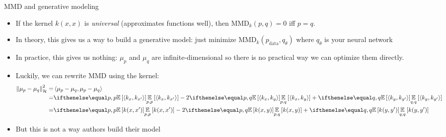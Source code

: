 \documentclass[handout, 10pt]{beamer}
\begin{document}
\begin{frame}{MMD and generative modeling}
\begin{itemize}
    \item\pause If the kernel $k(x,x)$ is \textit{universal} (approximates functions well), then $\text{MMD}_k(p,q) = 0$ iff $p = q$.
    \item\pause In theory, this gives us a way to build a generative model: just minimize $\text{MMD}_k(p_\text{data}, q_\theta)$ where $q_\theta$ is your neural network
    \item\pause In practice, this gives us nothing: $\mu_p$ and $\mu_q$ are infinite-dimensional so there is no practical way we can optimize them directly.
    \item\pause Luckily, we can rewrite $\text{MMD}$ using the kernel:
\begin{equation*}
\begin{aligned}
\left\|\mu_{p}-\mu_{q}\right\|_{\mathcal{H}}^{2}=&\left\langle\mu_{p}-\mu_{q}, \mu_{p}-\mu_{q}\right\rangle \\
=& \expect[p, p]{\langle k_x, k_{x^\prime}\rangle}
-2 \expect[p, q]{\langle k_x, k_y\rangle}
+\expect[q,q]{\langle k_y, k_{y^\prime}\rangle} \\
=& \expect[p, p]{k(x, x^{\prime})} - 2 \expect[p, q]{k(x, y)} +\expect[q, q]{k(y, y^{\prime})}
\end{aligned}
\end{equation*}
\item\pause But this is not a way authors build their model
\end{itemize}
\end{frame}
\end{document}
